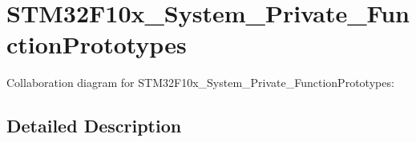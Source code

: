 \section{S\+T\+M32\+F10x\+\_\+\+System\+\_\+\+Private\+\_\+\+Function\+Prototypes}
\label{group___s_t_m32_f10x___system___private___function_prototypes}
Collaboration diagram for S\+T\+M32\+F10x\+\_\+\+System\+\_\+\+Private\+\_\+\+Function\+Prototypes\+:


\subsection{Detailed Description}

